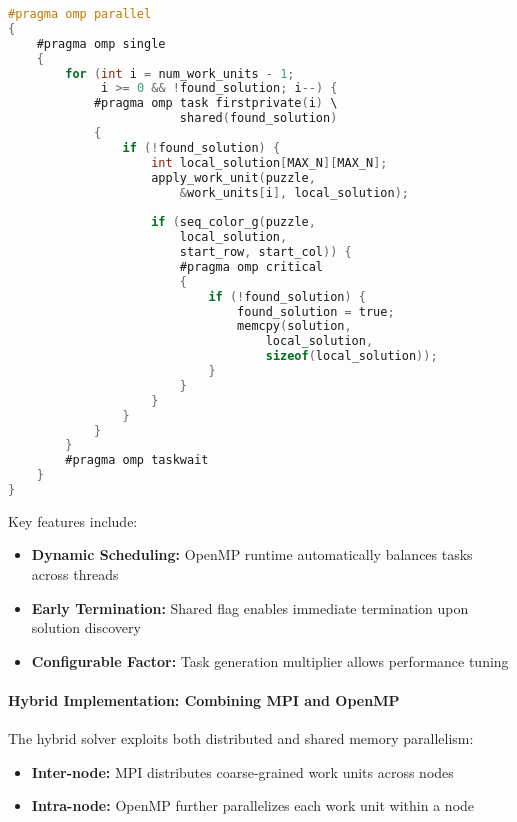 \begin{lstlisting}[language=C, caption=OpenMP task generation]
#pragma omp parallel
{
    #pragma omp single
    {
        for (int i = num_work_units - 1; 
             i >= 0 && !found_solution; i--) {
            #pragma omp task firstprivate(i) \
                        shared(found_solution)
            {
                if (!found_solution) {
                    int local_solution[MAX_N][MAX_N];
                    apply_work_unit(puzzle, 
                        &work_units[i], local_solution);
                    
                    if (seq_color_g(puzzle, 
                        local_solution, 
                        start_row, start_col)) {
                        #pragma omp critical
                        {
                            if (!found_solution) {
                                found_solution = true;
                                memcpy(solution, 
                                    local_solution, 
                                    sizeof(local_solution));
                            }
                        }
                    }
                }
            }
        }
        #pragma omp taskwait
    }
}
\end{lstlisting}

Key features include:
\begin{itemize}
    \item \textbf{Dynamic Scheduling:} OpenMP runtime automatically balances tasks across threads
    \item \textbf{Early Termination:} Shared flag enables immediate termination upon solution discovery
    \item \textbf{Configurable Factor:} Task generation multiplier allows performance tuning
\end{itemize}

\paragraph{Hybrid Implementation: Combining MPI and OpenMP}
\label{par:hybrid_implementation}
The hybrid solver exploits both distributed and shared memory parallelism:

\begin{itemize}
    \item \textbf{Inter-node:} MPI distributes coarse-grained work units across nodes
    \item \textbf{Intra-node:} OpenMP further parallelizes each work unit within a node
\end{itemize}

